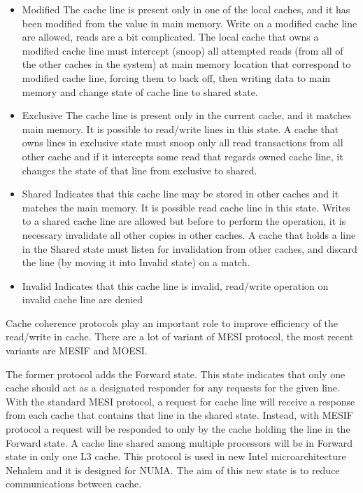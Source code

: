 \begin{itemize}

\item Modified
The cache line is present only in one of the local caches, and it has been modified from the value in main memory. Write on a modified cache line are 
allowed, reads are a bit complicated. The local cache that owns a modified cache line must intercept (snoop) all attempted reads (from all of the other 
caches in the system) at main memory location that correspond to modified cache line, forcing them to back off, then writing data to main memory and change
state of cache line to shared state.
 
\item Exclusive
The cache line is present only in the current cache, and it matches main memory. It is possible to read/write lines in this state. A cache that owns
lines in exclusive state must snoop only all read transactions from all other cache and if it intercepts some read that regards owned cache line, it changes
the state of that line from exclusive to shared.

\item Shared
Indicates that this cache line may be stored in other caches and it matches the main memory. It is possible read cache line in this state. Writes to a 
shared cache line are allowed but before to perform the operation, it is necessary invalidate all other copies in other caches.
A cache that holds a line in the Shared state must listen for invalidation from other caches, and discard the line (by moving it into Invalid state) on a 
match.

\item Invalid
Indicates that this cache line is invalid, read/write operation on invalid cache line are denied

\end{itemize}

Cache coherence protocols play an important role to improve efficiency of the read/write in cache. There are a lot of variant of MESI protocol, the most 
recent variants are MESIF and MOESI.

The former protocol adds the Forward state. This state indicates that only one cache should act as a designated 
responder for any requests for the given line. With the standard MESI protocol, a request for cache line will receive a response from each cache that 
contains that line in the shared state. Instead, with MESIF protocol a request will be responded to only by the cache holding the line in the Forward state.
A cache line shared among multiple processors will be in Forward state in only one L3 cache. This protocol is used in new Intel microarchitecture Nehalem 
and it is designed for NUMA. The aim of this new state is to reduce communications between cache.

